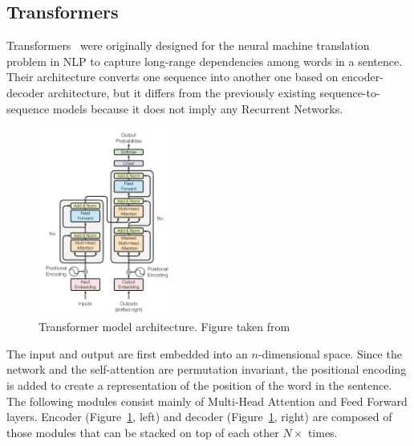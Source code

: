 \subsection{Transformers}
\label{trans}
Transformers~\cite{vaswani2017attention} were originally designed for the neural machine translation problem in NLP to capture long-range dependencies among words in a sentence.
Their architecture converts one sequence into another one based on encoder-decoder architecture,
but it differs from the previously existing sequence-to-sequence models because
it does not imply any Recurrent Networks. 
\begin{figure}
  \centering
  \includegraphics[width=0.4\textwidth]{figures/03_transformer_overview.png}
  \caption{Transformer model architecture. Figure taken from~\cite{vaswani2017attention}}
  \label{fig:trans_arch}
\end{figure}
The input and output are first embedded into an $n$-dimensional space.
Since the network and the self-attention are permutation invariant,
the positional encoding is added to create a representation of the position of the word in the sentence.
The following modules consist mainly of Multi-Head Attention and Feed Forward layers. 
Encoder (Figure~\ref{fig:trans_arch}, left) and decoder (Figure~\ref{fig:trans_arch}, right)
are composed of those modules that can be stacked on top of each other $N\times$ times.

